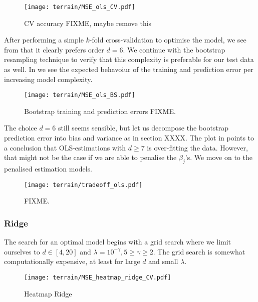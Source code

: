         
        \begin{figure}
            \texttt{[image: terrain/MSE\_ols\_CV.pdf]}
            \caption{CV accuracy FIXME, maybe remove this}
            \label{fig:gc_cv_errors_ols}
        \end{figure}

        After performing a simple $k$-fold cross-validation to optimise the model, we see from  that it clearly prefers order $d=6$. We continue with the bootstrap resampling technique to verify that this complexity is preferable for our test data as well. In  we see the expected behavoiur of the training and prediction error per increasing model complexity.
        

        \begin{figure}
            \texttt{[image: terrain/MSE\_ols\_BS.pdf]}
            \caption{Bootstrap training and prediction errors FIXME.}
            \label{fig:gc_model_complexity_ols}
        \end{figure}

        The choice $d=6$ still seems sensible, but let us decompose the bootstrap prediction error into bias and variance as in section XXXX. The plot in  points to a conclusion that OLS-estimations with $d\geq 7$ is over-fitting the data. However, that might not be the case if we are able to penalise the $\beta_j$'s. We move on to the penalised estimation models.

        \begin{figure}
            \texttt{[image: terrain/tradeoff\_ols.pdf]}
            \caption{FIXME.}
            \label{fig:gc_bias_variance_ols}
        \end{figure}


        \subsubsection{Ridge}\label{sec:gc_ridgeanalysis}


        The search for an optimal model begins with a grid search where we limit ourselves to $d\in[4, 20]$ and $\lambda=10^{-\gamma}, 5 \geq \gamma \geq 2$. The grid search is somewhat computationally expensive, at least for large $d$ and small $\lambda$.
        
        \begin{figure}
            \texttt{[image: terrain/MSE\_heatmap\_ridge\_CV.pdf]}
            \caption{Heatmap Ridge}
            \label{fig:gc_gridsearch_ridge}
        \end{figure}

